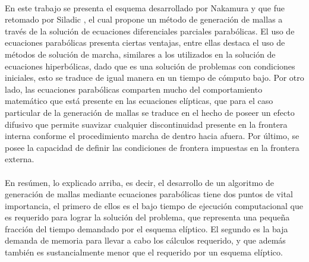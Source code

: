 \documentclass[letterpaper, openright, 12pt]{book}
\begin{document}
    \paragraph*{}
    En este trabajo se presenta el esquema desarrollado por Nakamura
    \cite{nakamuraParabolic} y que fue retomado por Siladic
    \cite{siladicParabolic}, el cual propone un método de generación de
    mallas a través de la solución de ecuaciones diferenciales parciales
    parabólicas. El uso de ecuaciones parabólicas presenta ciertas ventajas,
    entre ellas destaca el uso de métodos de solución de marcha, similares
    a los utilizados en la solución de ecuaciones hiperbólicas, dado que es
    una solución de problemas con condiciones iniciales, esto se traduce de
    igual manera en un tiempo de cómputo bajo. Por otro lado, las ecuaciones
    parabólicas comparten mucho del comportamiento matemático que está
    presente en las ecuaciones elípticas, que para el caso particular de la
    generación de mallas se traduce en el hecho de poseer un efecto difusivo
    que permite suavizar cualquier discontinuidad presente en la frontera
    interna conforme el procedimiento marcha de dentro hacia afuera. Por
    último, se posee la capacidad de definir las condiciones de frontera
    impuestas en la frontera externa.

    \paragraph*{}
    En resúmen, lo explicado arriba, es decir, el desarrollo de un algoritmo
    de generación de mallas mediante ecuaciones parabólicas tiene dos puntos
    de vital importancia, el primero de ellos es el bajo tiempo de ejecución
    computacional que es requerido para lograr la solución del problema, que
    representa una pequeña fracción del tiempo demandado por el esquema
    elíptico. El segundo es la baja demanda de memoria para llevar a cabo
    los cálculos requerido, y que además también es sustancialmente menor
    que el requerido por un esquema elíptico.
\end{document}
